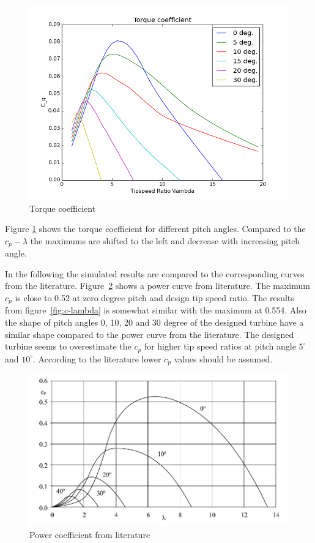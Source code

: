 \documentclass[10pt]{article}
\begin{document}
\begin{figure}[H]
\centering
\includegraphics[width=1\linewidth]{../CIP_3/WT_Perf/Output/torque.png}
\caption{Torque coefficient}
\label{fig:torque-coeff}
\end{figure} 
Figure \ref{fig:torque-coeff} shows the torque coefficient for different pitch angles. Compared to the $c_p-\lambda$ the maximums are shifted to the left and decrease with increasing pitch angle.  

In the following the simulated results are compared to the corresponding curves from the literature. Figure~\ref{fig:power-coeff-lit} shows a power curve from literature. The maximum $c_p$ is close to 0.52 at zero degree pitch and design tip speed ratio. The results from figure~\ref{fig:c-lambda} is somewhat similar with the maximum at 0.554. Also the shape of pitch angles 0, 10, 20 and 30 degree of the designed turbine have a similar shape compared to the power curve from the literature. The designed turbine seems to overestimate the $c_p$ for higher tip speed ratios at pitch angle $5^{\circ}$ and $10^{\circ}$. According to the literature lower $c_p$ values should be assumed.


\begin{figure}[H]
\centering
\includegraphics[width=1\linewidth]{../CIP_3/Report/power_coeff_literature.png}
\caption{Power coefficient from literature}
\label{fig:power-coeff-lit}
\end{figure} 
\end{document}
